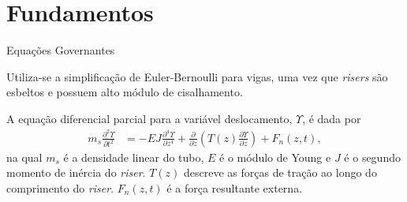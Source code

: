 \documentclass[10pt]{beamer}
\begin{document}
\section{Fundamentos}

\begin{frame}[fragile]{Equações Governantes}

\begin{block}{}
Utiliza-se a simplificação de Euler-Bernoulli para vigas, uma vez que \textit{risers} são esbeltos e possuem alto módulo de cisalhamento.
\end{block}

\begin{block}{}
A equação diferencial parcial para a variável deslocamento, $\Upsilon$, é dada por \begin{align}
	m_s \frac{\partial^2 \Upsilon}{\partial t^2} &= -E J	\frac{\partial^4 \Upsilon}{\partial z^4} + \frac{\partial}{\partial z}\left(T(z) \frac{\partial \Upsilon}{\partial z}\right) + F_n(z,t),
\end{align} na qual $m_s$ é a densidade linear do tubo, $E$ é o módulo de Young e $J$ é o segundo momento de inércia do \textit{riser}. $T(z)$ descreve as forças de tração ao longo do comprimento do \textit{riser}. $F_n(z,t)$ é a força resultante externa.\cite{fabricioIFAC}
\end{block}

\end{frame}
\end{document}
